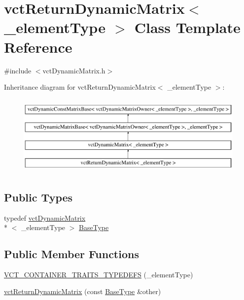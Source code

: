 \hypertarget{classvct_return_dynamic_matrix}{\section{vct\-Return\-Dynamic\-Matrix$<$ \-\_\-element\-Type $>$ Class Template Reference}
\label{classvct_return_dynamic_matrix}
}


{\ttfamily \#include $<$vct\-Dynamic\-Matrix.\-h$>$}

Inheritance diagram for vct\-Return\-Dynamic\-Matrix$<$ \-\_\-element\-Type $>$\-:\begin{figure}[H]
\begin{center}
\leavevmode
\includegraphics[height=4.000000cm]{d8/dbe/classvct_return_dynamic_matrix}
\end{center}
\end{figure}
\subsection*{Public Types}
\begin{DoxyCompactItemize}
\item 
typedef \hyperlink{classvct_dynamic_matrix}{vct\-Dynamic\-Matrix}\\*
$<$ \-\_\-element\-Type $>$ \hyperlink{classvct_return_dynamic_matrix_a28dcbb4e9972a46485593c2009a12ea8}{Base\-Type}
\end{DoxyCompactItemize}
\subsection*{Public Member Functions}
\begin{DoxyCompactItemize}
\item 
\hyperlink{classvct_return_dynamic_matrix_a2a3ab642a2e91db15078ef92fc96ae03}{V\-C\-T\-\_\-\-C\-O\-N\-T\-A\-I\-N\-E\-R\-\_\-\-T\-R\-A\-I\-T\-S\-\_\-\-T\-Y\-P\-E\-D\-E\-F\-S} (\-\_\-element\-Type)
\item 
\hyperlink{classvct_return_dynamic_matrix_a687f2622f53078303d60288d01249242}{vct\-Return\-Dynamic\-Matrix} (const \hyperlink{classvct_dynamic_matrix_a80b366a0b1c03c7a5453e76aea1fbe83}{Base\-Type} \&other)
\end{DoxyCompactItemize}
